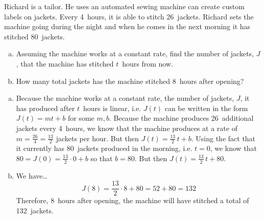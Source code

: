 \documentclass[11pt,letterpaper]{article}
\begin{document}
 Richard is a tailor. He uses an automated sewing machine can create custom labels on jackets. Every 4~hours, it is able to stitch 26~jackets. Richard sets the machine going during the night and when he comes in the next morning it has stitched 80~jackets.
	\begin{enumerate}[(a)]
	\item Assuming the machine works at a constant rate, find the number of jackets, $J$, that the machine has stitched $t$~hours from now.
	\item How many total jackets has the machine stitched 8~hours after opening?
	\end{enumerate} \pspace

\sol 
\begin{enumerate}[(a)]
\item Because the machine works at a constant rate, the number of jackets, $J$, it has produced after $t$~hours is linear, i.e. $J(t)$ can be written in the form $J(t)= mt + b$ for some $m, b$. Because the machine produces 26~additional jackets every 4~hours, we know that the machine produces at a rate of $m= \frac{26}{4}= \frac{13}{2}$ jackets per hour. But then $J(t)= \frac{13}{2}\,t + b$. Using the fact that it currently has 80~jackets produced in the morning, i.e. $t= 0$, we know that $80= J(0)= \frac{13}{2} \cdot 0 + b$ so that $b= 80$. But then $J(t)= \frac{13}{2}\,t + 80$. \pspace

\item We have\dots
	\[
	J(8)= \dfrac{13}{2} \cdot 8 + 80= 52 + 80= 132
	\]
Therefore, 8~hours after opening, the machine will have stitched a total of 132~jackets. 
\end{enumerate}
\end{document}
